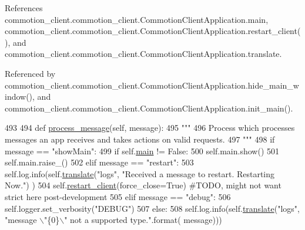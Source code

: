 References commotion\-\_\-client.\-commotion\-\_\-client.\-Commotion\-Client\-Application.\-main, commotion\-\_\-client.\-commotion\-\_\-client.\-Commotion\-Client\-Application.\-restart\-\_\-client(), and commotion\-\_\-client.\-commotion\-\_\-client.\-Commotion\-Client\-Application.\-translate.



Referenced by commotion\-\_\-client.\-commotion\-\_\-client.\-Commotion\-Client\-Application.\-hide\-\_\-main\-\_\-window(), and commotion\-\_\-client.\-commotion\-\_\-client.\-Commotion\-Client\-Application.\-init\-\_\-main().


\begin{DoxyCode}
493 
494     \textcolor{keyword}{def }\hyperlink{classcommotion__client_1_1commotion__client_1_1CommotionClientApplication_a981d54a4d40a4345a253be2b2a541127}{process\_message}(self, message):
495         \textcolor{stringliteral}{"""}
496 \textcolor{stringliteral}{        Process which processes messages an app receives and takes actions on valid requests.}
497 \textcolor{stringliteral}{        """}
498         \textcolor{keywordflow}{if} message == \textcolor{stringliteral}{"showMain"}:
499             \textcolor{keywordflow}{if} self.\hyperlink{classcommotion__client_1_1commotion__client_1_1CommotionClientApplication_a4ae692cf60dc0a935cf2e8a72f657d1a}{main} != \textcolor{keyword}{False}:
500                 self.main.show()
501                 self.main.raise\_()
502         \textcolor{keywordflow}{elif} message == \textcolor{stringliteral}{"restart"}:
503             self.log.info(self.\hyperlink{classcommotion__client_1_1commotion__client_1_1CommotionClientApplication_a57e951c9b241fb0e0c70055b4ca1b6f7}{translate}(\textcolor{stringliteral}{"logs"}, \textcolor{stringliteral}{"Received a message to restart. Restarting Now."})
      )
504             self.\hyperlink{classcommotion__client_1_1commotion__client_1_1CommotionClientApplication_af40aa0ed2df54b7edb7f3e474b336a63}{restart\_client}(force\_close=\textcolor{keyword}{True}) \textcolor{comment}{#TODO, might not want strict here
       post-development}
505         \textcolor{keywordflow}{elif} message == \textcolor{stringliteral}{"debug"}:
506             self.logger.set\_verbosity(\textcolor{stringliteral}{"DEBUG"})
507         \textcolor{keywordflow}{else}:
508             self.log.info(self.\hyperlink{classcommotion__client_1_1commotion__client_1_1CommotionClientApplication_a57e951c9b241fb0e0c70055b4ca1b6f7}{translate}(\textcolor{stringliteral}{"logs"}, \textcolor{stringliteral}{"message \(\backslash\)"\{0\}\(\backslash\)" not a supported type."}.format(
      message)))

\end{DoxyCode}
